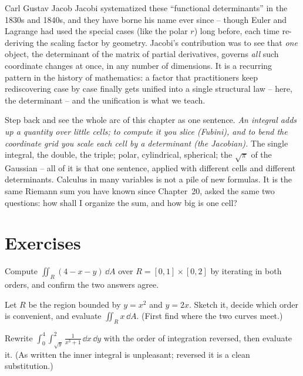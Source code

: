 \begin{historybox}
Carl Gustav Jacob Jacobi systematized these ``functional determinants'' in the
1830s and 1840s, and they have borne his name ever since -- though Euler and
Lagrange had used the special cases (like the polar $r$) long before, each time
re-deriving the scaling factor by geometry. Jacobi's contribution was to see that
\emph{one} object, the determinant of the matrix of partial derivatives, governs
\emph{all} such coordinate changes at once, in any number of dimensions. It is a
recurring pattern in the history of mathematics: a factor that practitioners keep
rediscovering case by case finally gets unified into a single structural law --
here, the determinant -- and the unification is what we teach.
\end{historybox}

\begin{aestheticbox}
Step back and see the whole arc of this chapter as one sentence. \emph{An integral
adds up a quantity over little cells; to compute it you slice (Fubini), and to
bend the coordinate grid you scale each cell by a determinant (the Jacobian).}
The single integral, the double, the triple; polar, cylindrical, spherical; the
$\sqrt\pi$ of the Gaussian -- all of it is that one sentence, applied with
different cells and different determinants. Calculus in many variables is not a
pile of new formulas. It is the same Riemann sum you have known since Chapter~20,
asked the same two questions: how shall I organize the sum, and how big is one
cell?
\end{aestheticbox}

\section{Exercises}
\label{ch34:exercises}

\begin{exercise}
Compute $\displaystyle\iint_R (4-x-y)\,\dd A$ over $R=[0,1]\times[0,2]$ by
iterating in both orders, and confirm the two answers agree.
\end{exercise}

\begin{exercise}
Let $R$ be the region bounded by $y=x^2$ and $y=2x$. Sketch it, decide which
order is convenient, and evaluate $\displaystyle\iint_R x\,\dd A$. (First find
where the two curves meet.)
\end{exercise}

\begin{exercise}
Rewrite
$\displaystyle\int_0^4\!\int_{\sqrt y}^{2} \frac{1}{x^3+1}\,\dd x\,\dd y$
with the order of integration reversed, then evaluate it. (As written the inner
integral is unpleasant; reversed it is a clean substitution.)
\end{exercise}

